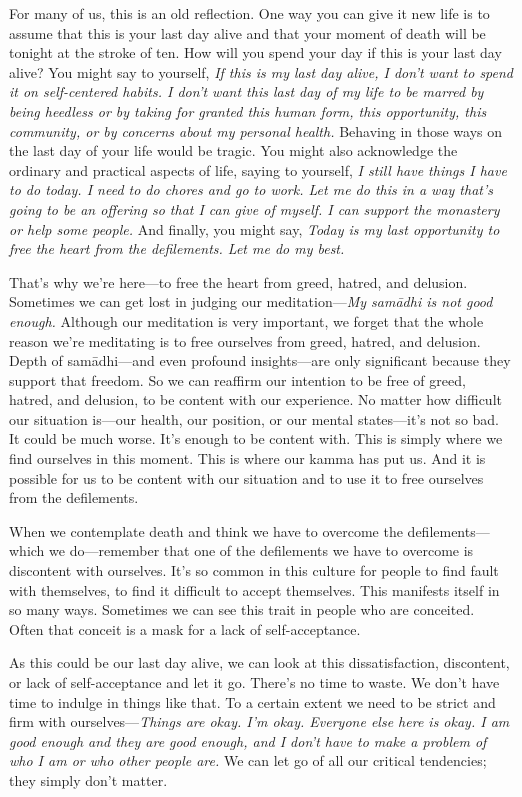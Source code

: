 For many of us, this is an old reflection. One way you can give it new 
life is to assume that this is your last day alive and that your moment 
of death will be tonight at the stroke of ten. How will you spend your 
day if this is your last day alive? You might say to yourself, \emph{If 
this is my last day alive, I don't want to spend it on self-centered 
habits. I don't want this last day of my life to be marred by being 
heedless or by taking for granted this human form, this opportunity, 
this community, or by concerns about my personal health.} Behaving in 
those ways on the last day of your life would be tragic. You might also 
acknowledge the ordinary and practical aspects of life, saying to 
yourself, \emph{I still have things I have to do today. I need to do 
chores and go to work. Let me do this in a way that's going to be an 
offering so that I can give of myself. I can support the monastery or 
help some people.} And finally, you might say, \emph{Today is my last 
opportunity to free the heart from the defilements. Let me do my best.}

That's why we're here---to free the heart from greed, hatred, and 
delusion. Sometimes we can get lost in judging our 
meditation---\emph{My samādhi is not good enough.} Although our 
meditation is very important, we forget that the whole reason we're 
meditating is to free ourselves from greed, hatred, and delusion. Depth 
of samādhi---and even profound insights---are only significant because 
they support that freedom. So we can reaffirm our intention to be free 
of greed, hatred, and delusion, to be content with our experience. No 
matter how difficult our situation is---our health, our position, or 
our mental states---it's not so bad. It could be much worse. It's 
enough to be content with. This is simply where we find ourselves in 
this moment. This is where our kamma has put us. And it is possible for 
us to be content with our situation and to use it to free ourselves 
from the defilements.

When we contemplate death and think we have to overcome the 
defilements---which we do---remember that one of the defilements we 
have to overcome is discontent with ourselves. It's so common in this 
culture for people to find fault with themselves, to find it difficult 
to accept themselves. This manifests itself in so many ways. Sometimes 
we can see this trait in people who are conceited. Often that conceit 
is a mask for a lack of self-acceptance.

As this could be our last day alive, we can look at this 
dissatisfaction, discontent, or lack of self-acceptance and let it go. 
There's no time to waste. We don't have time to indulge in things like 
that. To a certain extent we need to be strict and firm with 
ourselves---\emph{Things are okay. I'm okay. Everyone else here is 
okay. I am good enough and they are good enough, and I don't have to 
make a problem of who I am or who other people are.} We can let go of 
all our critical tendencies; they simply don't matter.

